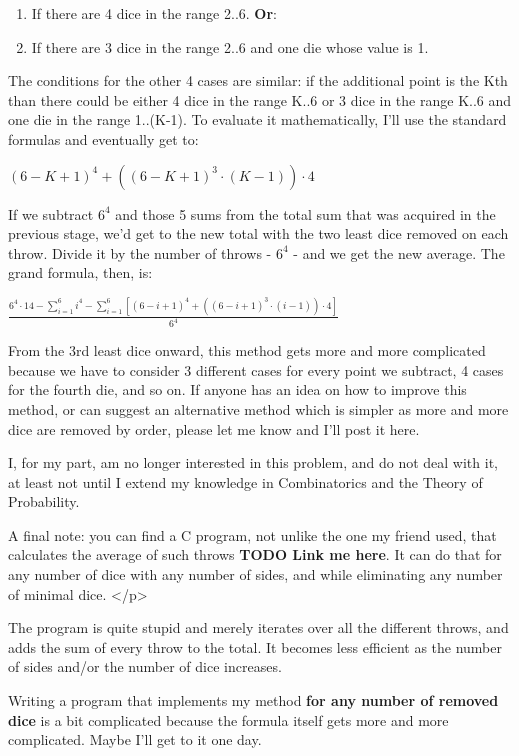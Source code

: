 \documentclass[a4paper]{article}
\begin{document}
\begin{enumerate}
\item If there are 4 dice in the range 2..6. {\bf Or}:
\item If there are 3 dice in the range 2..6 and one die whose value is 1.
\end{enumerate}

The conditions for the other 4 cases are similar: if the additional point
is the Kth than there could be either 4 dice in the range K..6 or 3 dice in
the range K..6 and one die in the range 1..(K-1). To evaluate it
mathematically, I'll use the standard formulas and eventually get to:

$\left(6-K+1\right)^4  +  \left( \left(6-K+1\right)^3 \cdot \left(K-1\right) \right) \cdot 4$


If we subtract $6^4$ and those 5 sums from the total sum that was acquired in
the previous stage, we'd get to the new total with the two least dice
removed on each throw. Divide it by the number of throws - $6^4$ - and we get
the new average. The grand formula, then, is:

$ \frac{
    6^4\cdot14-\sum\limits_{i=1}^{6}\left.i^4\right. -
    \sum\limits_{i=1}^{6}\left[\left(6-i+1\right)^4+\left(\left(6-i+1\right)^3
    \cdot \left(i-1\right)\right) \cdot 4 \right]
}{6^4}$

From the 3rd least dice onward, this method gets more and more complicated
because we have to consider 3 different cases for every point we
subtract, 4 cases for the fourth die, and so on. If anyone has an idea
on how to improve this method, or can suggest an alternative method
which is simpler as more and more dice are removed by order, please let
me know and I'll post it here.

I, for my part, am no longer interested in this problem, and do not deal
with it, at least not until I extend my knowledge in Combinatorics and the
Theory of Probability.

A final note: you can find a C program, not unlike the one my friend used,
that calculates the average of such throws
{\bf TODO Link me here}. It can do that for any number of
dice with any number of sides, and while eliminating any number of minimal
dice.
</p>

The program is quite stupid and merely iterates over all the
different throws, and adds the sum of every throw to the total. It
becomes less efficient as the number of sides and/or the number of dice
increases.

Writing a program that implements my method {\bf for any number of removed
dice} is a bit complicated because the formula itself gets more and more
complicated. Maybe I'll get to it one day.
\end{document}

